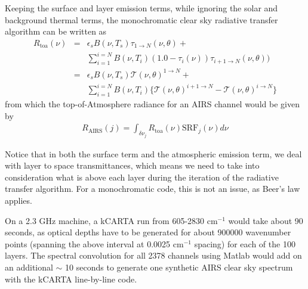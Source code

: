 \documentclass[11pt]{article}
\newcommand{\kc}{\textsf{kCARTA}\xspace}
\newcommand{\wn}{cm$^{-1}$\xspace}
\begin{document}
Keeping the surface and layer emission terms, while ignoring the solar
and background thermal terms, the monochromatic clear sky radiative
transfer algorithm can be written as
\begin{eqnarray*}
  R_{\text{toa}}(\nu) & = & \epsilon_{s} B(\nu,T_{s}) \tau_{1 \rightarrow N}(\nu,\theta) + \\
  &   &  \sum_{i=1}^{i=N} B(\nu,T_{i})
  (1.0 - \tau_{i}(\nu)) \tau_{i+1 \rightarrow N}(\nu,\theta)) \\
  & = & \epsilon_{s} B(\nu,T_{s}) \mathcal{T}(\nu,\theta)^{1 \rightarrow N} + \\
  &   &  \sum_{i=1}^{i=N} B(\nu,T_{i}) \{ \mathcal{T}(\nu,\theta)^{i+1\rightarrow N} - 
  \mathcal{T}(\nu,\theta)^{i \rightarrow N} \}
\end{eqnarray*}
from which the top-of-Atmosphere radiance for an AIRS channel would be
given by
\begin{eqnarray*}
  R_{\text{AIRS}}(j) = \int_{\delta \nu_{j}} R_{\text{toa}}(\nu) \text{SRF}_{j}(\nu) d\nu
\end{eqnarray*}

Notice that in both the surface term and the atmospheric emission
term, we deal with layer to space transmittances, which means we need
to take into consideration what is above each layer during the
iteration of the radiative transfer algorithm. For a monochromatic
code, this is not an issue, as Beer's law applies.

On a 2.3 GHz machine, a \kc run from 605-2830 \wn would take about 90
seconds, as optical depths have to be generated for about 900000
wavenumber points (spanning the above interval at 0.0025 \wn spacing)
for each of the 100 layers. The spectral convolution for all 2378
channels using Matlab would add on an additional $\sim$ 10 seconds to
generate one synthetic AIRS clear sky spectrum with the \kc
line-by-line code.
\end{document}
